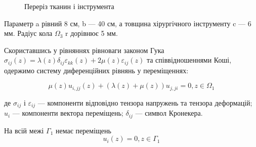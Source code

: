 \begin{figure}[ht!]
    \centering
    
    \caption{Переріз тканин і інструмента}
    \label{fig:elasticity_2d_domain}
\end{figure}

\noindent Параметр a рівний 8 см, b --- 40 см, а товщина хірургічного інструменту c --- 6 мм. Радіус кола $\Omega_3$ r 
дорівнює 5 мм.

Скориставшись у рівняннях рівноваги законом Гука 
$\sigma_{ij}(z) = \lambda(z)\delta_{ij}\varepsilon_{kk}(z) + 2\mu(z)\varepsilon_{ij}(z)$ та співвідношеннями Коші, 
одержимо систему диференційних рівнянь у переміщеннях:

\begin{equation}
    \label{eqn:elasticity_2d_eqn}
    \mu(z)u_{i,jj}(z) + (\lambda(z) + \mu(z))u_{j,ji} = 0, z \in \Omega_1
\end{equation}

\noindent де $\sigma_{ij}$ і $\varepsilon_{ij}$ --- компоненти відповідно тензора напружень та тензора деформацій; $u_i$
--- компоненти вектора переміщень; $\delta_{ij}$ --- символ Кронекера.

\noindent На всій межі $\Gamma_1$ немає переміщень
\begin{equation}
    \label{eqn:elasticity_2d_cond_1}
    u_i(z) = 0, z \in \Gamma_1
\end{equation}


